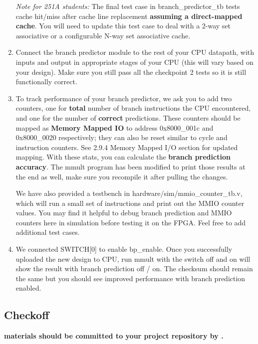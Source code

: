 \documentclass[11pt]{article}
\begin{document}
\begin{enumerate}
  \textit{Note for 251A students:} The final test case in branch\_predictor\_tb tests cache hit/miss after cache line replacement \textbf{assuming a direct-mapped cache}. You will need to update this test case to deal with a 2-way set associative or a configurable N-way set associative cache.
  \item Connect the branch predictor module to the rest of your CPU datapath, with inputs and output in appropriate stages of your CPU (this will vary based on your design). Make sure you still pass all the checkpoint 2 tests so it is still functionally correct. 
  \item To track performance of your branch predictor, we ask you to add two counters, one for \textbf{total} number of branch instructions the CPU encountered, and one for the number of \textbf{correct} predictions. These counters should be mapped as \textbf{Memory Mapped IO} to address 0x8000\_001c and 0x8000\_0020 respectively; they can also be reset similar to cycle and instruction counters. See 2.9.4 Memory Mapped I/O section for updated mapping.  With these stats, you can calculate the \textbf{branch prediction accuracy}. The mmult program has been modified to print those results at the end as well, make sure you recompile it after pulling the changes. 

  We have also provided a testbench in hardware/sim/mmio\_counter\_tb.v, which will run a small set of instructions and print out the MMIO counter values. You may find it helpful to debug branch prediction and MMIO counters here in simulation before testing it on the FPGA. Feel free to add additional test cases.
  \item We connected SWITCH[0] to enable bp\_enable. Once you successfully uploaded the new design to CPU, run mmult with the switch off and on will show the result with branch prediction off / on. The checksum should remain the same but you should see improved performance with branch prediction enabled.
  
\end{enumerate}

\subsection{Checkoff}
\textbf{\branchPredictorTaskName \space materials should be committed to your project repository by \branchPredictorDueDate.}
\end{document}
